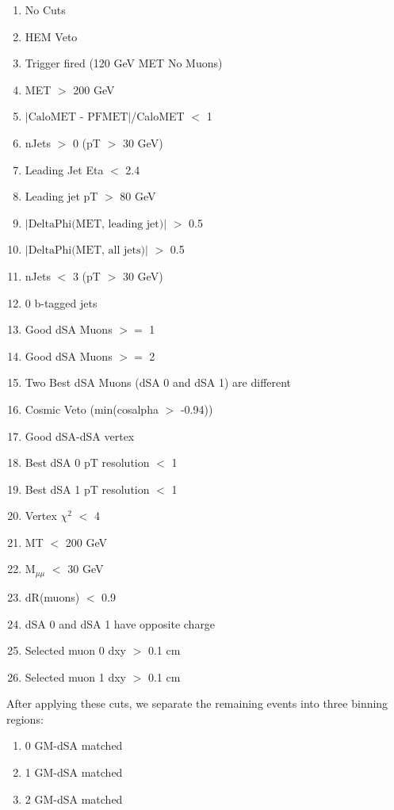 \documentclass{article}
\begin{document}
    \begin{enumerate}
        \item No Cuts
        \item HEM Veto
        \item Trigger fired (120 GeV MET No Muons)
        \item MET $>$ 200 GeV
        \item $|\text{CaloMET - PFMET}|$/CaloMET $<$ 1
        \item nJets $>$ 0 (pT $>$ 30 GeV)
        \item Leading Jet Eta $<$ 2.4
        \item Leading jet pT $>$ 80 GeV
        \item $|\text{DeltaPhi(MET, leading jet)}|$ $>$ 0.5
        \item $|\text{DeltaPhi(MET, all jets)}|$ $>$ 0.5
        \item nJets $<$ 3 (pT $>$ 30 GeV)
        \item 0 b-tagged jets
        \item Good dSA Muons $>=$ 1
        \item Good dSA Muons $>=$ 2
        \item Two Best dSA Muons (dSA 0 and dSA 1) are different
        \item Cosmic Veto (min(cosalpha $>$ -0.94))
        \item Good dSA-dSA vertex
        \item Best dSA 0 pT resolution $<$ 1
        \item Best dSA 1 pT resolution $<$ 1
        \item Vertex $\chi^{2}$ $<$ 4
        \item MT $<$ 200 GeV
        \item M$_{\mu\mu}$ $<$ 30 GeV
        \item dR(muons) $<$ 0.9
        \item dSA 0 and dSA 1 have opposite charge
        \item Selected muon 0 dxy $>$ 0.1 cm
        \item Selected muon 1 dxy $>$ 0.1 cm
    \end{enumerate}
\par
After applying these cuts, we separate the remaining events into three binning regions:
    \begin{enumerate}
        \item 0 GM-dSA matched
        \item 1 GM-dSA matched
        \item 2 GM-dSA matched
    \end{enumerate}
\end{document}
